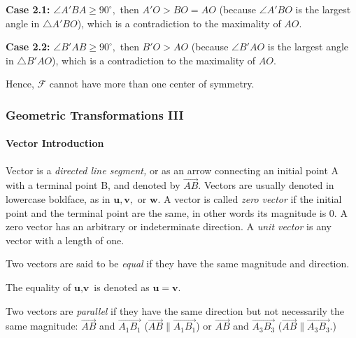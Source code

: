 \documentclass[8pt,xcolor=table,dvipsnames]{beamer}
\newcommand{\dg}{^\circ}
\begin{document}
\begin{frame}[t]
\begin{overprint}
        \textbf{Case 2.1:} $\angle A'BA \ge 90\dg,$ then $A'O > BO = AO$ (because $\angle A'BO$ is the largest angle in $\triangle A'BO$),
        which is a contradiction to the maximality of $AO.$
    
        \textbf{Case 2.2:} $\angle B'AB \ge 90\dg,$ then $B'O > AO$ (because $\angle B'AO$ is the largest angle in $\triangle B'AO$),
        which is a contradiction to the maximality of $AO.$
    
        \bigbreak
        Hence, $\mathcal{F}$ cannot have more than one center of symmetry.
    \end{overprint}
\end{frame}

\begin{frame}[t]
    \frametitle{Geometric Transformations III}
    \framesubtitle{Vector Introduction}
    \begin{overprint}
        \begin{definition}[Vector]
            Vector is a \textit{directed line segment,} or as an arrow connecting an initial point A with a terminal point B, and denoted by $\overrightarrow{AB}.$
            Vectors are usually denoted in lowercase boldface, as in $\textbf{u}, \textbf{v},$ or $\textbf{w}.$
            \bigbreak
            A vector is called \textit{zero vector} if the initial point and the terminal point are the same, in other words its magnitude is 0.
            A zero vector has an arbitrary or indeterminate direction.
            A \textit{unit vector} is any vector with a length of one.
        \end{definition}
        
        \begin{definition}[Equality]
            Two vectors are said to be \textit{equal} if they have the same magnitude and direction.
        
            The equality of $\textbf{u}, \textbf{v}$ is denoted as $\textbf{u} = \textbf{v}.$
        \end{definition}
        
        \begin{definition}
            Two vectors are \textit{parallel} if they have the same direction but not necessarily the same magnitude: 
            $\overrightarrow{AB}$ and $\overrightarrow{A_1B_1}$ ($\overrightarrow{AB} \parallel \overrightarrow{A_1B_1}$)
            or $\overrightarrow{AB}$ and $\overrightarrow{A_3B_3}$ ($\overrightarrow{AB} \parallel \overrightarrow{A_3B_3}.$)
        

\end{definition}
\end{overprint}
\end{frame}
\end{document}
